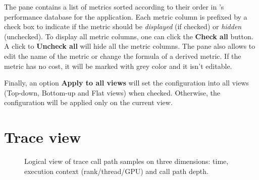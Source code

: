 \begin{itemize}
The pane contains a list of metrics sorted according to their order in \HPCToolkit{}'s performance database for the application.
Each metric column is prefixed by a check box to indicate if the metric should be \textit{displayed} (if checked) or \textit{hidden} (unchecked).
To display all metric columns, one can click the \textbf{Check all} button.
A click to \textbf{Uncheck all} will hide all the metric columns.
The pane also allows to edit the name of the metric or change the formula of a derived metric.
If the metric has no cost, it will be marked with grey color and it isn't editable.

Finally, an option \textbf{Apply to all views} will set the configuration into all views (Top-down, Bottom-up and Flat views) when checked.
Otherwise, the configuration will be applied only on the current view.

\end{itemize}



\section{Trace view}
\label{sec:trace}


\newcommand{\crosshair}{crosshair}
\newcommand{\traceview}{Main View}
\newcommand{\depthview}{Depth View}
\newcommand{\summaryview}{Summary View}
\newcommand{\miniview}{Mini Map View}
\newcommand{\callview}{Call Stack View}
\newcommand{\statview}{Statistics View}
\newcommand{\blameview}{GPU Idleness Blame View}



\begin{figure}[t]
\caption{Logical view of trace call path samples on three dimensions: time, execution context (rank/thread/GPU) and call path depth.}
\label{fig:hpctraceviewer-callpath}
\end{figure}

